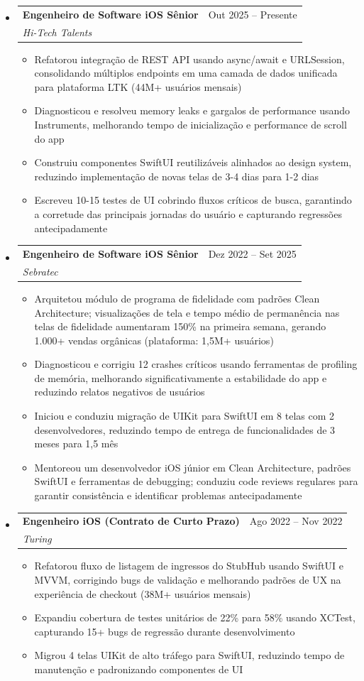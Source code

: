 \documentclass[11pt,letterpaper]{article}
\makeatletter
\newcommand{\resumeSubheading}[4]{
  \item
    \begin{tabular*}{\textwidth}{l@{\extracolsep{\fill}}r}
      \textbf{#1} & #2 \\
      \textit{#3} & \textit{#4} \\
    \end{tabular*}
}
\newcommand{\resumeItem}[1]{
  \item\small{#1}
}
\makeatother
\begin{document}
\begin{itemize}[leftmargin=0.15in]
    \resumeSubheading
        {Engenheiro de Software iOS Sênior}{Out 2025 -- Presente}
        {Hi-Tech Talents}{}
        \begin{itemize}
            \resumeItem{Refatorou integração de REST API usando async/await e URLSession, consolidando múltiplos endpoints em uma camada de dados unificada para plataforma LTK (44M+ usuários mensais)}
            \resumeItem{Diagnosticou e resolveu memory leaks e gargalos de performance usando Instruments, melhorando tempo de inicialização e performance de scroll do app}
            \resumeItem{Construiu componentes SwiftUI reutilizáveis alinhados ao design system, reduzindo implementação de novas telas de 3-4 dias para 1-2 dias}
            \resumeItem{Escreveu 10-15 testes de UI cobrindo fluxos críticos de busca, garantindo a corretude das principais jornadas do usuário e capturando regressões antecipadamente}
        \end{itemize}

    \resumeSubheading
        {Engenheiro de Software iOS Sênior}{Dez 2022 -- Set 2025}
        {Sebratec}{}
        \begin{itemize}
            \resumeItem{Arquitetou módulo de programa de fidelidade com padrões Clean Architecture; visualizações de tela e tempo médio de permanência nas telas de fidelidade aumentaram 150\% na primeira semana, gerando 1.000+ vendas orgânicas (plataforma: 1,5M+ usuários)}
            \resumeItem{Diagnosticou e corrigiu 12 crashes críticos usando ferramentas de profiling de memória, melhorando significativamente a estabilidade do app e reduzindo relatos negativos de usuários}
            \resumeItem{Iniciou e conduziu migração de UIKit para SwiftUI em 8 telas com 2 desenvolvedores, reduzindo tempo de entrega de funcionalidades de 3 meses para 1,5 mês}
            \resumeItem{Mentoreou um desenvolvedor iOS júnior em Clean Architecture, padrões SwiftUI e ferramentas de debugging; conduziu code reviews regulares para garantir consistência e identificar problemas antecipadamente}
        \end{itemize}

    \resumeSubheading
        {Engenheiro iOS (Contrato de Curto Prazo)}{Ago 2022 -- Nov 2022}
        {Turing}{}
        \begin{itemize}
            \resumeItem{Refatorou fluxo de listagem de ingressos do StubHub usando SwiftUI e MVVM, corrigindo bugs de validação e melhorando padrões de UX na experiência de checkout (38M+ usuários mensais)}
            \resumeItem{Expandiu cobertura de testes unitários de 22\% para 58\% usando XCTest, capturando 15+ bugs de regressão durante desenvolvimento}
            \resumeItem{Migrou 4 telas UIKit de alto tráfego para SwiftUI, reduzindo tempo de manutenção e padronizando componentes de UI}
        \end{itemize}


\end{itemize}
\end{document}
